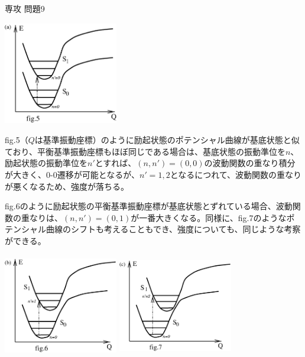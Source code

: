 \documentclass[fleqn]{jbook}
\begin{document}
\begin{answer}{専攻 問題9}{}
\begin{subanswers}
\begin{subsubanswers}
\parbox[t]{60mm}{\vspace*{-10mm}
\begin{center}
\includegraphics[clip,height=45mm,width=50mm]{1997phy9-9.eps}
\end{center}}\parbox[t]{100mm}{fig.5（$Q$は基準振動座標）のように励起状態のポテンシャル曲線が基底状態と似ており、平衡基準振動座標もほぼ同じである場合は、基底状態の振動準位を$n$、励起状態の振動準位を$n'$とすれば、$(n,n')=(0,0)$の波動関数の重なり積分が大きく、0-0遷移が可能となるが、$n'=1,2$となるにつれて、波動関数の重なりが悪くなるため、強度が落ちる。}

\parbox[t]{60mm}
{fig.6のように励起状態の平衡基準振動座標が基底状態とずれている場合、波動関数の重なりは、$(n,n')=(0,1)$が一番大きくなる。同様に、fig.7のようなポテンシャル曲線のシフトも考えることもでき、強度についても、同じような考察ができる。
}\hspace{-7mm}\parbox[t]{120mm}
{\vspace*{-10mm}
\begin{center}
\includegraphics[clip,height=45mm,width=50mm]{1997phy9-10.eps}
\includegraphics[clip,height=45mm,width=50mm]{1997phy9-11.eps}
\end{center}}


\end{subsubanswers}
\end{subanswers}
\end{answer}
\end{document}
